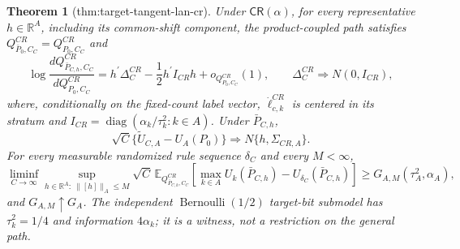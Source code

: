 \documentclass{article}
\newtheorem{theorem}{Theorem}
\begin{document}
\begin{theorem}[thm:target-tangent-lan-cr]\label{thm:target-tangent-lan-cr}
Under \(\mathsf{CR}(\alpha)\), for every representative \(h\in\mathbb R^A\), including its common-shift component, the product-coupled path satisfies \(Q^{CR}_{\bar P_0,C_C}=Q^{CR}_{P_0,C_C}\) and
\[
\log\frac{dQ^{CR}_{\bar P_{C,h},C_C}}{dQ^{CR}_{P_0,C_C}}
=h^{\prime}\Delta_C^{CR}-\frac12h^{\prime}I_{CR}h+o_{Q^{CR}_{P_0,C_C}}(1),
\qquad \Delta_C^{CR}\Rightarrow N(0,I_{CR}),
\]
where, conditionally on the fixed-count label vector, \(\dot\ell_{c,k}^{CR}\) is centered in its stratum and \(I_{CR}=\operatorname{diag}(\alpha_k/\tau_k^2:k\in A)\).  Under \(\bar P_{C,h}\),
\[
\sqrt C\{\widetilde U_{C,A}-U_A(P_0)\}\Rightarrow N\{h,\Sigma_{CR,A}\}.
\]
For every measurable randomized rule sequence \(\delta_C\) and every \(M<\infty\),
\[
\liminf_{C\to\infty}\sup_{h\in\mathbb R^A:\ \lVert[h]\rVert_A\leq M}
\sqrt C\,\mathbb E_{Q^{CR}_{\bar P_{C,h},C_C}}
\left[\max_{k\in A}U_k(\bar P_{C,h})-U_{\delta_C}(\bar P_{C,h})\right]
\geq G_{A,M}(\tau_A^2,\alpha_A),
\]
and \(G_{A,M}\uparrow G_A\).  The independent \(\operatorname{Bernoulli}(1/2)\) target-bit submodel has \(\tau_k^2=1/4\) and information \(4\alpha_k\); it is a witness, not a restriction on the general path.
\end{theorem}
\end{document}

